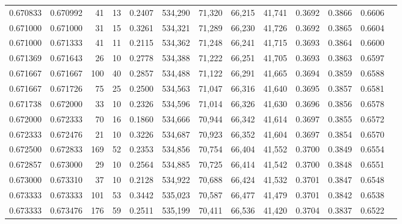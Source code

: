 \begin{tabular}{rrrrrrrrrrrrr}
0.670833 & 0.670992 &    41 &  13 &                                     0.2407 & 534,290 &  71,320 &  66,215 &  41,741 & 0.3692 & 0.3866 & 0.6606 \\
0.671000 & 0.671000 &    31 &  15 &                                     0.3261 & 534,321 &  71,289 &  66,230 &  41,726 & 0.3692 & 0.3865 & 0.6604 \\
0.671000 & 0.671333 &    41 &  11 &                                     0.2115 & 534,362 &  71,248 &  66,241 &  41,715 & 0.3693 & 0.3864 & 0.6600 \\
0.671369 & 0.671643 &    26 &  10 &                                     0.2778 & 534,388 &  71,222 &  66,251 &  41,705 & 0.3693 & 0.3863 & 0.6597 \\
0.671667 & 0.671667 &   100 &  40 &                                     0.2857 & 534,488 &  71,122 &  66,291 &  41,665 & 0.3694 & 0.3859 & 0.6588 \\
0.671667 & 0.671726 &    75 &  25 &                                     0.2500 & 534,563 &  71,047 &  66,316 &  41,640 & 0.3695 & 0.3857 & 0.6581 \\
0.671738 & 0.672000 &    33 &  10 &                                     0.2326 & 534,596 &  71,014 &  66,326 &  41,630 & 0.3696 & 0.3856 & 0.6578 \\
0.672000 & 0.672333 &    70 &  16 &                                     0.1860 & 534,666 &  70,944 &  66,342 &  41,614 & 0.3697 & 0.3855 & 0.6572 \\
0.672333 & 0.672476 &    21 &  10 &                                     0.3226 & 534,687 &  70,923 &  66,352 &  41,604 & 0.3697 & 0.3854 & 0.6570 \\
0.672500 & 0.672833 &   169 &  52 &                                     0.2353 & 534,856 &  70,754 &  66,404 &  41,552 & 0.3700 & 0.3849 & 0.6554 \\
0.672857 & 0.673000 &    29 &  10 &                                     0.2564 & 534,885 &  70,725 &  66,414 &  41,542 & 0.3700 & 0.3848 & 0.6551 \\
0.673000 & 0.673310 &    37 &  10 &                                     0.2128 & 534,922 &  70,688 &  66,424 &  41,532 & 0.3701 & 0.3847 & 0.6548 \\
0.673333 & 0.673333 &   101 &  53 &                                     0.3442 & 535,023 &  70,587 &  66,477 &  41,479 & 0.3701 & 0.3842 & 0.6538 \\
0.673333 & 0.673476 &   176 &  59 &                                     0.2511 & 535,199 &  70,411 &  66,536 &  41,420 & 0.3704 & 0.3837 & 0.6522 \\

\end{tabular}
